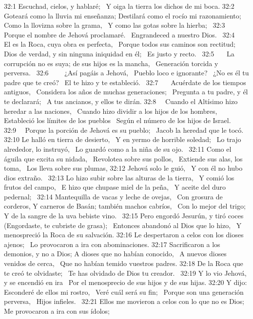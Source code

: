 32:1 Escuchad, cielos, y hablaré;  
Y oiga la tierra los dichos de mi boca. 
32:2   Goteará como la lluvia mi enseñanza; 
Destilará como el rocío mi razonamiento;  
Como la llovizna sobre la grama,  
Y como las gotas sobre la hierba;  
32:3    Porque el nombre de Jehová proclamaré.  
Engrandeced a nuestro Dios.  
32:4    El es la Roca, cuya obra es perfecta,  
Porque todos sus caminos son rectitud;  
Dios de verdad, y sin ninguna iniquidad en él;  
Es justo y recto.  
32:5    La corrupción no es suya; de sus hijos es la mancha,  
Generación torcida y perversa.  
32:6     ¿Así pagáis a Jehová,  
Pueblo loco e ignorante?  
¿No es él tu padre que te creó?  
El te hizo y te estableció.  
32:7    Acuérdate de los tiempos antiguos,  
Considera los años de muchas generaciones;  
Pregunta a tu padre, y él te declarará;  
A tus ancianos, y ellos te dirán. 
32:8   Cuando el Altísimo hizo heredar a las naciones,  
Cuando hizo dividir a los hijos de los hombres,  
Estableció los límites de los pueblos  
Según el número de los hijos de Israel.  
32:9   Porque la porción de Jehová es su pueblo;  
Jacob la heredad que le tocó.  
32:10 Le halló en tierra de desierto,  
Y en yermo de horrible soledad;  
Lo trajo alrededor, lo instruyó,  
Lo guardó como a la niña de su ojo.  
32:11 Como el águila que excita su nidada,  
Revolotea sobre sus pollos,  
Extiende sus alas, los toma,  
Los lleva sobre sus plumas, 
32:12 Jehová solo le guió,  
Y con él no hubo dios extraño.  
32:13 Lo hizo subir sobre las alturas de la tierra,  
Y comió los frutos del campo,  
E hizo que chupase miel de la peña,  
Y aceite del duro pedernal;  
32:14 Mantequilla de vacas y leche de ovejas,  
Con grosura de corderos, 
Y carneros de Basán; también machos cabríos,  
Con lo mejor del trigo;  
Y de la sangre de la uva bebiste vino.  
32:15 Pero engordó Jesurún, y tiró coces  
(Engordaste, te cubriste de grasa);  
Entonces abandonó al Dios que lo hizo,  
Y menospreció la Roca de su salvación. 
32:16 Le despertaron a celos con los dioses ajenos;  
Lo provocaron a ira con abominaciones. 
32:17 Sacrificaron a los demonios, y no a Dios; 
A dioses que no habían conocido,  
A nuevos dioses venidos de cerca,  
Que no habían temido vuestros padres. 
32:18 De la Roca que te creó te olvidaste;  
Te has olvidado de Dios tu creador.  
32:19 Y lo vio Jehová, y se encendió en ira  
Por el menosprecio de sus hijos y de sus hijas. 
32:20 Y dijo: Esconderé de ellos mi rostro,  
Veré cuál será su fin;  
Porque son una generación perversa,  
Hijos infieles.  
32:21 Ellos me movieron a celos con lo que no es Dios;  
Me provocaron a ira con sus ídolos;  
